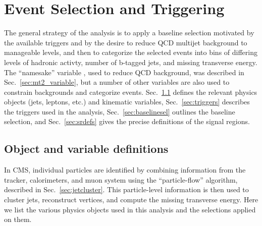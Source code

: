 \chapter{Event Selection and Triggering}
\label{chap:event_selection}

The general strategy of the \mttwo analysis is to apply a baseline selection
motivated by the available triggers and by the desire to reduce QCD multijet
background to manageable levels, and then to categorize the selected events
into bins of differing levels of hadronic activty, number of b-tagged jets, 
and missing transverse energy. The ``namesake'' variable \mttwo, used to reduce
QCD background, was described in Sec.~\ref{sec:mt2_variable}, but a number of other
variables are also used to constrain backgrounds and categorize events.
Sec.~\ref{sec:objvardefs} defines the
relevant physics objects (jets, leptons, etc.) and kinematic variables, Sec.~\ref{sec:triggers} describes
the triggers used in the analysis, Sec.~\ref{sec:baselinesel} outlines the
baseline selection, and Sec.~\ref{sec:srdefs} gives the precise definitions
of the signal regions.

\section{Object and variable definitions}
\label{sec:objvardefs}

In CMS, individual particles are identified by combining information from the tracker, calorimeters, and muon system
using the ``particle-flow'' algorithm, described in Sec.~\ref{sec:jetcluster}. This particle-level information is
then used to cluster jets, reconstruct vertices, and compute the missing transverse energy. Here we list the various
physics objects used in this analysis and the selections applied on them.


